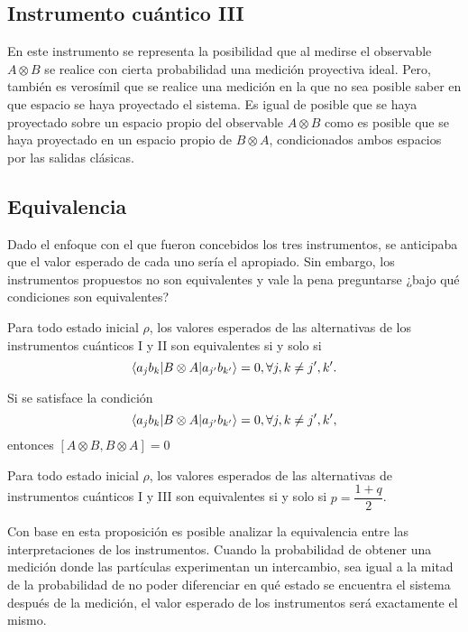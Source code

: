 \documentclass[12pt,letterpaper]{book}\raggedbottom{}
\begin{document}
\subsection{Instrumento cuántico III}
 En este instrumento se representa la posibilidad que al medirse el observable $A\otimes B$ se realice con cierta probabilidad una medición proyectiva ideal. Pero, también es verosímil que se realice una medición en la que no sea posible saber en que espacio se haya proyectado el sistema. Es igual de posible que se haya proyectado sobre un espacio propio del observable $A\otimes B$ como es posible que se haya proyectado en un espacio propio de $B\otimes A$,  condicionados ambos espacios por las salidas clásicas. 


\subsection{Equivalencia}

Dado el enfoque con el que fueron concebidos los tres instrumentos, se anticipaba que el valor esperado de cada uno sería el apropiado. Sin embargo, los instrumentos propuestos no son equivalentes y vale la pena preguntarse ¿bajo qué condiciones son equivalentes?
\begin{proposition}\label{prop:Equivalencia-instruments1-2}
    Para todo estado inicial $\rho$, los valores esperados de las alternativas
de los instrumentos cuánticos I y II son equivalentes si y solo si \begin{equation}\label{eq:Condicion-equivalencia1-2}
    \langle a_j
b_k|B\otimes A|a_{j'}b_{k'}\rangle=0, \forall j,k\ne j',k'.
\end{equation}
\end{proposition}

\begin{proposition}
    Si se satisface la condición  \[\langle a_j b_k|B\otimes A|a_{j'}b_{k'}\rangle=0, \forall j,k\ne j',k', \]  entonces $[A\otimes B,B \otimes A]=0$  
\end{proposition}


\begin{proposition}\label{prop:Equivalencia-instruments-1-3}
    Para todo estado inicial $\rho$, los valores esperados de las alternativas
de instrumentos cuánticos I y III son equivalentes si y solo si
$p=\dfrac{1+q}{2}$.

Con base en esta proposición es posible analizar la equivalencia entre las interpretaciones de los instrumentos. Cuando la probabilidad %
de obtener una medición donde las partículas experimentan un intercambio, sea igual a la mitad de la probabilidad %
 de no poder diferenciar en qué estado se encuentra el sistema después de la medición, el valor esperado de los instrumentos  será exactamente el mismo.   
\end{proposition}
\end{document}
